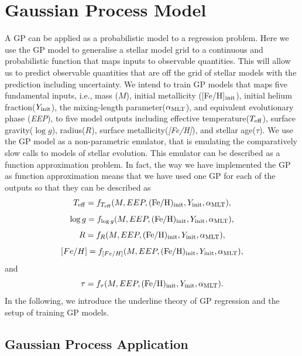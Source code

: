 \section{Gaussian Process Model}\label{sec:gpmodel}
A GP can be applied as a probabilistic model to a regression problem.  Here we use the GP model to generalise a stellar model grid to a continuous and probabilistic function that maps inputs to observable quantities.  This will allow us to predict observable quantities that are off the grid of stellar models with the prediction including uncertainty. 
%
We intend to train GP models that maps five fundamental inputs,  i.e., mass ($M$), initial metallicity ([Fe/H]$_{\rm init}$), initial helium fraction($Y_{\rm init}$), the mixing-length parameter($\alpha_{\rm MLT}$), and equivalent evolutionary phase ({\it EEP}), to five model outputs including effective temperature($T_{\rm eff}$), surface gravity($\log g$), radius($R$), surface metallicity({\it [Fe/H]}), and stellar age($\tau$). We use the GP model as a non-parametric emulator, that is emulating the comparatively slow calls to models of stellar evolution.
This emulator can be described as a function approximation problem. In fact, the way we have implemented the GP as function approximation means that we have used one GP for each of the outputs so that they can be described as
\begin{equation}\label{gprmodel1}
{T_{\rm eff}} = f_{T_{\rm eff}}(M, EEP, ({\rm Fe/H})_{\rm init}, Y_{\rm init}, \alpha_{\rm MLT}),
\end{equation}
\begin{equation}\label{gprmodel1}
{\log g} = f_{\log g}(M, EEP, ({\rm Fe/H})_{\rm init}, Y_{\rm init}, \alpha_{\rm MLT}),
\end{equation}
\begin{equation}\label{gprmodel1}
{R} = f_{R}(M, EEP, ({\rm Fe/H})_{\rm init}, Y_{\rm init}, \alpha_{\rm MLT}),
\end{equation}
\begin{equation}\label{gprmodel1}
{[Fe/H]} = f_{[Fe/H]}(M, EEP, ({\rm Fe/H})_{\rm init}, Y_{\rm init}, \alpha_{\rm MLT}),
\end{equation}
and 
\begin{equation}\label{gprmodel1}
{\tau} = f_{\tau}(M, EEP, ({\rm Fe/H})_{\rm init}, Y_{\rm init}, \alpha_{\rm MLT}).
\end{equation}
In the following, we introduce the underline theory of GP regression and the setup of training GP models.  


\subsection{Gaussian Process Application}

